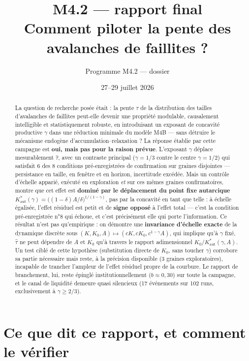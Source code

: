 \documentclass[11pt,a4paper]{article}
\title{M4.2 --- rapport final\\
\large Comment piloter la pente des avalanches de faillites ?}
\author{Programme M4.2 --- dossier \code{m4\_2\_credit\_soc}}
\date{27--29 juillet 2026}
\newcommand{\Kaut}{K^{*}_{\mathrm{aut}}}
\begin{document}
\maketitle

\begin{abstract}
La question de recherche posée était : la pente $\tau$ de la
distribution des tailles d'avalanches de faillites peut-elle devenir une
propriété modulable, causalement intelligible et statistiquement
robuste, en introduisant un exposant de concavité productive $\gamma$
dans une réduction minimale du modèle M4B --- sans détruire le mécanisme
endogène d'accumulation--relaxation ? La réponse établie par cette
campagne est \textbf{oui, mais pas pour la raison prévue}. L'exposant
$\gamma$ déplace mesurablement $\hat\tau$, avec un contraste principal
($\gamma=1/3$ contre le centre $\gamma=1/2$) qui satisfait 6 des 8
conditions pré-enregistrées de confirmation sur graines disjointes ---
persistance en taille, en fenêtre et en horizon, incertitude excédée.
Mais un contrôle d'échelle apparié, exécuté en exploration \emph{et} sur
ces mêmes graines confirmatoires, montre que cet effet est
\textbf{dominé par le déplacement du point fixe autarcique}
$\Kaut(\gamma)=\bigl((1-\delta)A/\delta\bigr)^{1/(1-\gamma)}$, pas par
la concavité en tant que telle : à échelle égalisée, l'effet résiduel
est petit et de \textbf{signe opposé} à l'effet total --- c'est la
condition pré-enregistrée n°8 qui échoue, et c'est précisément elle qui
porte l'information. Ce résultat n'est pas qu'empirique : on démontre
une \textbf{invariance d'échelle exacte} de la dynamique discrète sous
$(K,K_0,A)\mapsto(cK,cK_0,c^{1-\gamma}A)$, qui implique qu'à $\gamma$
fixé, $\hat\tau$ ne peut dépendre de $A$ et $K_0$ qu'à travers le
rapport adimensionnel $K_0/\Kaut(\gamma,A)$. Un test ciblé de cette
hypothèse (substitution directe de $K_0$, sans toucher $\gamma$)
corrobore sa partie nécessaire mais reste, à la précision disponible
(3 graines exploratoires), incapable de trancher l'ampleur de l'effet
résiduel propre de la courbure. Le rapport de branchement, lui, reste
épinglé institutionnellement ($b\approx0{,}30$) sur toute la campagne,
et le canal de liquidité demeure quasi silencieux (17 événements sur
102 runs, exclusivement à $\gamma\ge2/3$).
\end{abstract}

\tableofcontents

\section{Ce que dit ce rapport, et comment le vérifier}
\end{document}
